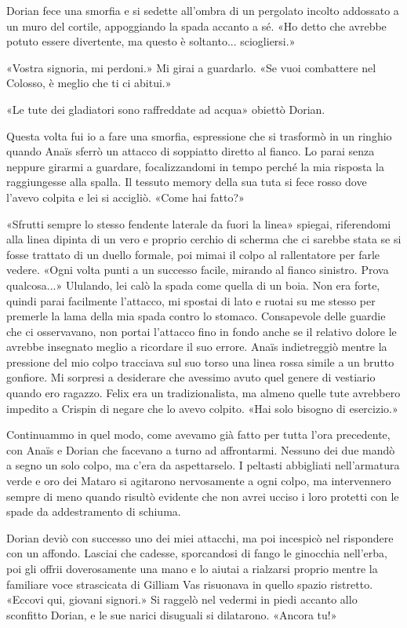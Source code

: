 Dorian fece una smorfia e si sedette all'ombra di un pergolato incolto
addossato a un muro del cortile, appoggiando la spada accanto a sé. «Ho
detto che avrebbe potuto essere divertente, ma questo è soltanto...
sciogliersi.»

«Vostra signoria, mi perdoni.» Mi girai a guardarlo. «Se vuoi combattere
nel Colosso, è meglio che ti ci abitui.»

«Le tute dei gladiatori sono raffreddate ad acqua» obiettò Dorian.

Questa volta fui io a fare una smorfia, espressione che si trasformò in
un ringhio quando Anaïs sferrò un attacco di soppiatto diretto al
fianco. Lo parai senza neppure girarmi a guardare, focalizzandomi in
tempo perché la mia risposta la raggiungesse alla spalla. Il tessuto
memory della sua tuta si fece rosso dove l'avevo colpita e lei si
accigliò. «Come hai fatto?»

«Sfrutti sempre lo stesso fendente laterale da fuori la linea» spiegai,
riferendomi alla linea dipinta di un vero e proprio cerchio di scherma
che ci sarebbe stata se si fosse trattato di un duello formale, poi
mimai il colpo al rallentatore per farle vedere. «Ogni volta punti a un
successo facile, mirando al fianco sinistro. Prova qualcosa...»
Ululando, lei calò la spada come quella di un boia. Non era forte,
quindi parai facilmente l'attacco, mi spostai di lato e ruotai su me
stesso per premerle la lama della mia spada contro lo stomaco.
Consapevole delle guardie che ci osservavano, non portai l'attacco fino
in fondo anche se il relativo dolore le avrebbe insegnato meglio a
ricordare il suo errore. Anaïs indietreggiò mentre la pressione del mio
colpo tracciava sul suo torso una linea rossa simile a un brutto
gonfiore. Mi sorpresi a desiderare che avessimo avuto quel genere di
vestiario quando ero ragazzo. Felix era un tradizionalista, ma almeno
quelle tute avrebbero impedito a Crispin di negare che lo avevo colpito.
«Hai solo bisogno di esercizio.»

Continuammo in quel modo, come avevamo già fatto per tutta l'ora
precedente, con Anaïs e Dorian che facevano a turno ad affrontarmi.
Nessuno dei due mandò a segno un solo colpo, ma c'era da aspettarselo. I
peltasti abbigliati nell'armatura verde e oro dei Mataro si agitarono
nervosamente a ogni colpo, ma intervennero sempre di meno quando risultò
evidente che non avrei ucciso i loro protetti con le spade da
addestramento di schiuma.

Dorian deviò con successo uno dei miei attacchi, ma poi incespicò nel
rispondere con un affondo. Lasciai che cadesse, sporcandosi di fango le
ginocchia nell'erba, poi gli offrii doverosamente una mano e lo aiutai a
rialzarsi proprio mentre la familiare voce strascicata di Gilliam Vas
risuonava in quello spazio ristretto. «Eccovi qui, giovani signori.» Si
raggelò nel vedermi in piedi accanto allo sconfitto Dorian, e le sue
narici disuguali si dilatarono. «Ancora tu!»

